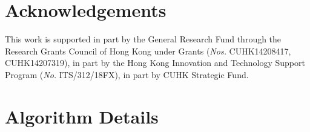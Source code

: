 \documentclass{article}
\begin{document}
\section*{Acknowledgements}

This work is supported in part by the General Research Fund through the Research Grants Council of Hong Kong under Grants (\textit{Nos.} CUHK14208417, CUHK14207319), in part by the Hong Kong Innovation and Technology Support Program (\textit{No.} ITS/312/18FX), in part by CUHK Strategic Fund.








\small

\normalsize



\appendix







\section{Algorithm Details}
\label{sec:app_alg}
\end{document}
